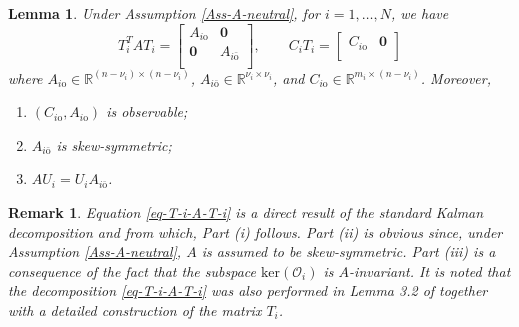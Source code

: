 \documentclass[twocolumn]{autart}
\newcommand{\RR}{\mathbb{R}}
\newtheorem{Remark}{Remark}
\newtheorem{Lemma}{Lemma}
\begin{document}
\begin{Lemma}\label{Lemma-transformation}
Under Assumption  \ref{Ass-A-neutral},
for $i=1,\ldots,N$, we have
 \begin{equation}\label{eq-T-i-A-T-i}
    T_{i}^{T}AT_{i}=\left[
                          \begin{array}{cc}
                            A_{i\text{o}} & \mathbf{0} \\
                            \mathbf{0} & A_{i\bar{\text{o}}} \\
                          \end{array}
                        \right], \qquad C_{i}T_{i}=\left[
                                                    \begin{array}{cc}
                                                      C_{i\text{o}} & \mathbf{0} \\
                                                    \end{array}
                                                  \right]
\end{equation}
where $A_{i\text{o}}\in \RR^{(n-\nu_{i})\times (n-\nu_{i})}$,
$A_{i\bar{\text{o}}}\in \RR^{\nu_{i}\times \nu_{i}}$,
and $C_{i\text{o}} \in \RR^{m_{i}\times (n-\nu_{i})}$.
Moreover,
\begin{enumerate}
  \item[(i)] $(C_{i\text{o}},  A_{i\text{o}})$ is observable;

  \item[(ii)] $A_{i\bar{\text{o}}}$ is skew-symmetric;

  \item[(iii)] $A U_{i}=U_{i} A_{i\bar{\text{o}}}$.
\end{enumerate}
\end{Lemma}



\begin{Remark}
  Equation \eqref{eq-T-i-A-T-i} is a direct result of the standard Kalman decomposition and from which, Part (i) follows.
  Part (ii) is obvious since,  under Assumption \ref{Ass-A-neutral}, $A$ is assumed to be skew-symmetric.
  Part (iii) is a consequence of the fact that the subspace $\text{ker}(\mathcal{O}_{i})$ is $A$-invariant.
  It is noted that the decomposition \eqref{eq-T-i-A-T-i} was also performed in Lemma 3.2 of \cite{ZhangLu21ACC}
  together with a detailed construction of the matrix $T_{i}$.
\end{Remark}
\end{document}
